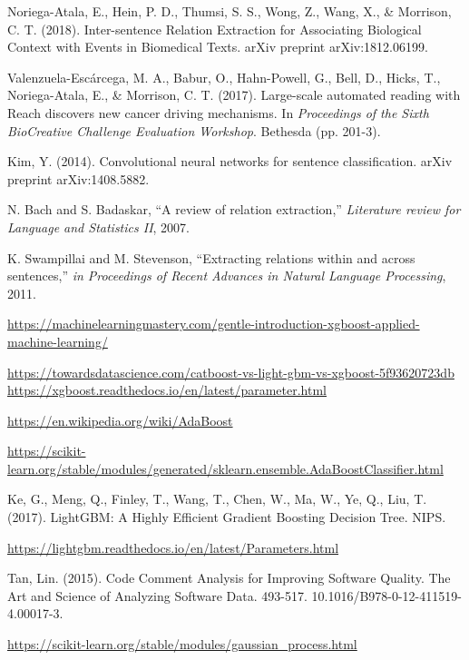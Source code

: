 \documentclass[10pt]{article}
\begin{document}
\begin{thebibliography}{999}
    Noriega-Atala, E., Hein, P. D., Thumsi, S. S., Wong, Z., Wang, X., \& Morrison, C. T. (2018). Inter-sentence Relation Extraction for Associating Biological Context with Events in Biomedical Texts. arXiv preprint arXiv:1812.06199.

    Valenzuela-Escárcega, M. A., Babur, O., Hahn-Powell, G., Bell, D., Hicks, T., Noriega-Atala, E., \& Morrison, C. T. (2017). Large-scale automated reading with Reach discovers new cancer driving mechanisms. In \textit{Proceedings of the Sixth BioCreative Challenge Evaluation Workshop}. Bethesda (pp. 201-3).

    Kim, Y. (2014). Convolutional neural networks for sentence classification. arXiv preprint arXiv:1408.5882.

    N. Bach and S. Badaskar, “A review of relation extraction,” \textit{Literature review for Language and Statistics II}, 2007.

    K. Swampillai and M. Stevenson, “Extracting relations within and across sentences,” \textit{in Proceedings of Recent Advances in Natural Language Processing}, 2011.


  \url{https://machinelearningmastery.com/gentle-introduction-xgboost-applied-machine-learning/}

    \url{https://towardsdatascience.com/catboost-vs-light-gbm-vs-xgboost-5f93620723db}
  \url{https://xgboost.readthedocs.io/en/latest/parameter.html}

  \url{https://en.wikipedia.org/wiki/AdaBoost}

  \url{https://scikit-learn.org/stable/modules/generated/sklearn.ensemble.AdaBoostClassifier.html}


    Ke, G., Meng, Q., Finley, T., Wang, T., Chen, W., Ma, W., Ye, Q., Liu, T. (2017). LightGBM: A Highly Efficient Gradient Boosting Decision Tree. NIPS.

    \url{https://lightgbm.readthedocs.io/en/latest/Parameters.html}

    Tan, Lin. (2015). Code Comment Analysis for Improving Software Quality. The Art and Science of Analyzing Software Data. 493-517. 10.1016/B978-0-12-411519-4.00017-3.


    \url{https://scikit-learn.org/stable/modules/gaussian_process.html}

\end{thebibliography}
\end{document}
